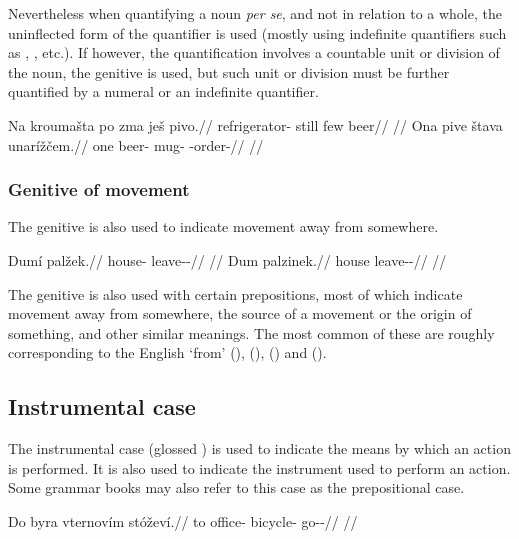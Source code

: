 Nevertheless when quantifying a noun \emph{per se}, and not in relation to a
whole, the uninflected form of the quantifier is used (mostly using indefinite
quantifiers such as , , etc.). If however, the
quantification involves a countable unit or division of the noun, the genitive
is used, but such unit or division must be further quantified by a numeral or an
indefinite quantifier.

\pex
\a
\begingl
\gla Na kroumašta po zma ješ pivo.//
\glb \Loc{} refrigerator-\Acc{} still few \Exst{} beer//
\glft {}//
\endgl
\a
\begingl
\gla Ona pive štava unarížčem.//
\glb one beer-\Gen{} mug-\Acc{} \Refl{}-order-//
\glft {}//
\endgl
\xe

\subsubsection{Genitive of movement}

The genitive is also used to indicate movement away from somewhere.

\pex
\a
\begingl
\gla Dumí palžek.//
\glb house-\Gen{} leave-\Av{}-\Pf{}//
\glft {}//
\endgl
\a
\begingl
\gla Dum palzinek.//
\glb house leave-\Pv{}-\Pf{}//
\glft {}//
\endgl
\xe

The genitive is also used with certain prepositions, most of which indicate
movement away from somewhere, the source of a movement or the origin of
something, and other similar meanings. The most common of these are 
roughly corresponding to the English `from' (),  (),
 () and
 ().

\subsection{Instrumental case}\label{sec:instrumental-case}

The instrumental case (glossed \Ins{}) is used to indicate the means by which an
action is performed. It is also used to indicate the instrument used to perform
an action. Some grammar books may also refer to this case as the prepositional
case.

\pex
\begingl
\gla Do byra vternovím stóževí.//
\glb to office-\Acc{} bicycle-\Ins{} go-\Av{}-\Cont{}//
\glft {}//
\endgl
\xe

